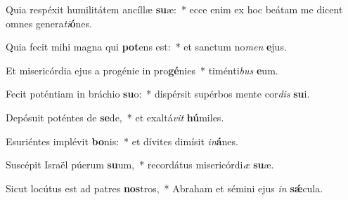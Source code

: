 \item Quia respéxit humilitátem ancíllæ \textbf{su}æ:~* ecce enim ex hoc beátam me dicent omnes genera\textit{ti}\textbf{ó}nes.
\item Quia fecit mihi magna qui \textbf{pot}ens est:~* et sanctum no\textit{men} \textbf{e}jus.
\item Et misericórdia ejus a progénie in pro\textbf{gé}nies~* timénti\textit{bus} \textbf{e}um.
\item Fecit poténtiam in bráchio \textbf{su}o:~* dispérsit supérbos mente cor\textit{dis} \textbf{su}i.
\item Depósuit poténtes de \textbf{se}de,~* et exaltá\textit{vit} \textbf{hú}miles.
\item Esuriéntes implévit \textbf{bo}nis:~* et dívites dimísit \textit{in}\textbf{á}nes.
\item Suscépit Israël púerum \textbf{su}um,~* recordátus misericórdi\textit{æ} \textbf{su}æ.
\item Sicut locútus est ad patres \textbf{nos}tros,~* Abraham et sémini ejus \textit{in} \textbf{sǽ}cula.
